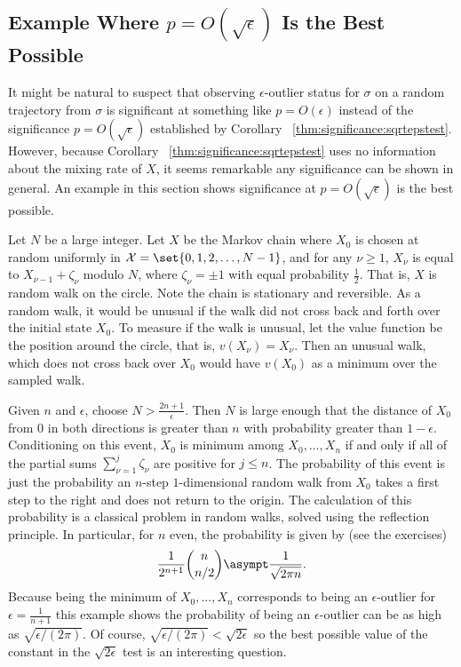 \documentclass[12pt]{article}
\begin{document}
\subsection*{Example Where \( p = O(\sqrt{\epsilon}) \) Is the Best
Possible}

It might be natural to suspect that observing \( \epsilon \)-outlier
status for \( \sigma \) on a random trajectory from \( \sigma \) is
significant at something like \( p = O(\epsilon) \) instead of the
significance \( p = O(\sqrt{\epsilon}) \) established by Corollary~%
\ref{thm:significance:sqrtepstest}.  However, because Corollary~%
\ref{thm:significance:sqrtepstest} uses no information about the mixing
rate of \( X \), it seems remarkable any significance can be shown in
general.  An example in this section shows significance at \( p = O(
\sqrt{\epsilon}) \) is the best possible.

Let \( N \) be a large integer.  Let \( X \) be the Markov chain where \(
X_0 \) is chosen at random uniformly in \( \mathcal{X} = \set{0, 1, 2,
\dots , N-1} \), and for any \( \nu \ge 1 \), \( X_{\nu} \) is equal to \(
X_{\nu-1} + \zeta_{\nu} \) modulo \( N \), where \( \zeta_{\nu} = \pm 1 \)
with equal probability \( \frac{1}{2} \).  That is, \( X \) is random
walk on the circle.  Note the chain is stationary and reversible.  As a
random walk, it would be unusual if the walk did not cross back and
forth over the initial state \( X_0 \).  To measure if the walk is
unusual, let the value function be the position around the circle, that
is, \( v(X_{\nu}) = X_{\nu} \).  Then an unusual walk, which does not
cross back over \( X_0 \) would have \( v(X_0) \) as a minimum over the
sampled walk.

Given \( n \) and \( \epsilon \), choose \( N > \frac{2n+1}{\epsilon} \).
Then \( N \) is large enough that the distance of \( X_0 \) from \( 0 \)
in both directions is greater than \( n \) with probability greater than
\( 1 - \epsilon \).  Conditioning on this event, \( X_0 \) is minimum
among \( X_0, \dots , X_n \) if and only if all of the partial sums \(
\sum\limits_{\nu=1}^ {j} \zeta_\nu \) are positive for \( j \le n \).
The probability of this event is just the probability an \( n \)-step \(
1 \)-dimensional random walk from \( X_0 \) takes a first step to the
right and does not return to the origin.  The calculation of this
probability is a classical problem in random walks, solved using the
reflection principle.  In particular, for \( n \) even, the probability
is given by (see the exercises)
\[
    \frac{1}{2^{n+1}}\binom{n}{n/2} \asympt \frac{1}{\sqrt{2 \pi n}}.
\] Because being the minimum of \( X_0, \dots , X_n \) corresponds to
being an \( \epsilon \)-outlier for \( \epsilon = \frac{1}{n+1} \) this
example shows the probability of being an \( \epsilon \)-outlier can be
as high as \( \sqrt{\epsilon/(2\pi)} \).  Of course, \( \sqrt{\epsilon/
(2\pi)} < \sqrt{2\epsilon} \) so the best possible value of the constant
in the \( \sqrt{2\epsilon} \) test is an interesting question.
\end{document}
